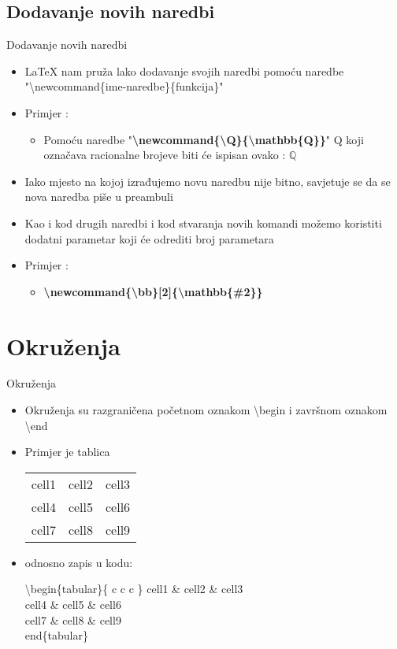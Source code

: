 \documentclass{beamer}
\begin{document}
\subsection{Dodavanje novih naredbi}

\begin{frame}[t]{Dodavanje novih naredbi}
\begin{itemize}
	\item LaTeX nam pruža lako dodavanje svojih naredbi pomoću naredbe "\textbackslash newcommand\{ime-naredbe\}\{funkcija\}"
	\item Primjer :
	\begin{itemize}
		\newcommand{\Q}{\mathbb{Q}} 
		\item Pomoću naredbe "\textbf{\textbackslash newcommand\{\textbackslash Q\}\{\textbackslash mathbb\{Q\}\}}" Q koji označava racionalne brojeve biti će ispisan ovako : \( \Q \)
	\end{itemize}
	\item Iako mjesto na kojoj izrađujemo novu naredbu nije bitno, savjetuje se da se nova naredba piše u preambuli	 
	\item Kao i kod drugih naredbi i kod stvaranja novih komandi možemo koristiti dodatni parametar koji će odrediti broj parametara 
	\item Primjer :
		\begin{itemize}
			\item \textbf{\textbackslash newcommand\{\textbackslash bb\}{[}2{]}\{\textbackslash mathbb\{\#2\}\}}
		\end{itemize}	
\end{itemize}	
\end{frame}
\section{Okruženja}

\begin{frame}[t]{Okruženja}
\begin{itemize}
	\item Okruženja su razgraničena početnom oznakom \textbackslash begin i završnom oznakom \textbackslash end
	\item Primjer je tablica


\begin{tabular}{ c c c } 
  cell1 & cell2 & cell3 \\ 
  cell4 & cell5 & cell6 \\ 
  cell7 & cell8 & cell9 \\ 
 \end{tabular}

\item odnosno zapis u kodu:

\textbackslash begin\{tabular\}\{ c c c \} 
  cell1 \& cell2 \& cell3 \\ 
  cell4 \& cell5 \& cell6 \\ 
  cell7 \& cell8 \& cell9 \\ 
 end\{tabular\}


\end{itemize}
\end{frame}
\end{document}
